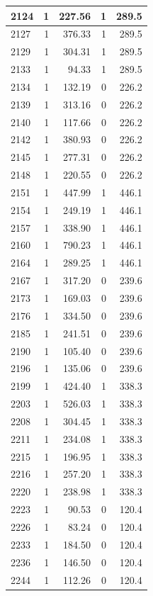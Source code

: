 \documentclass[
  spanish,
  12pt,
]{book}
\begin{document}
\begin{tabular}{l|r|r|r|r}
\hline
2124 & 1 & 227.56 & 1 & 289.5\\
\hline
2127 & 1 & 376.33 & 1 & 289.5\\
\hline
2129 & 1 & 304.31 & 1 & 289.5\\
\hline
2133 & 1 & 94.33 & 1 & 289.5\\
\hline
2134 & 1 & 132.19 & 0 & 226.2\\
\hline
2139 & 1 & 313.16 & 0 & 226.2\\
\hline
2140 & 1 & 117.66 & 0 & 226.2\\
\hline
2142 & 1 & 380.93 & 0 & 226.2\\
\hline
2145 & 1 & 277.31 & 0 & 226.2\\
\hline
2148 & 1 & 220.55 & 0 & 226.2\\
\hline
2151 & 1 & 447.99 & 1 & 446.1\\
\hline
2154 & 1 & 249.19 & 1 & 446.1\\
\hline
2157 & 1 & 338.90 & 1 & 446.1\\
\hline
2160 & 1 & 790.23 & 1 & 446.1\\
\hline
2164 & 1 & 289.25 & 1 & 446.1\\
\hline
2167 & 1 & 317.20 & 0 & 239.6\\
\hline
2173 & 1 & 169.03 & 0 & 239.6\\
\hline
2176 & 1 & 334.50 & 0 & 239.6\\
\hline
2185 & 1 & 241.51 & 0 & 239.6\\
\hline
2190 & 1 & 105.40 & 0 & 239.6\\
\hline
2196 & 1 & 135.06 & 0 & 239.6\\
\hline
2199 & 1 & 424.40 & 1 & 338.3\\
\hline
2203 & 1 & 526.03 & 1 & 338.3\\
\hline
2208 & 1 & 304.45 & 1 & 338.3\\
\hline
2211 & 1 & 234.08 & 1 & 338.3\\
\hline
2215 & 1 & 196.95 & 1 & 338.3\\
\hline
2216 & 1 & 257.20 & 1 & 338.3\\
\hline
2220 & 1 & 238.98 & 1 & 338.3\\
\hline
2223 & 1 & 90.53 & 0 & 120.4\\
\hline
2226 & 1 & 83.24 & 0 & 120.4\\
\hline
2233 & 1 & 184.50 & 0 & 120.4\\
\hline
2236 & 1 & 146.50 & 0 & 120.4\\
\hline
2244 & 1 & 112.26 & 0 & 120.4\\

\end{tabular}
\end{document}
